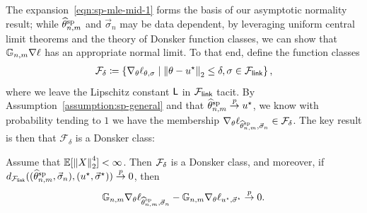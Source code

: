 The expansion~\eqref{eqn:sp-mle-mid-1} forms the basis of our asymptotic
normality result; while $\widehat{\theta}^{\textup{sp}}_{n,m}$ and $\vec{\sigma}_n$ may be data
dependent, by leveraging uniform central limit theorems and the
theory of Donsker function classes, we can show that
$\mathbb{G}_{n,m} \nabla \ell$ has an appropriate normal limit.
To that end,
define the
function classes
\begin{align*}
	\mathcal{F}_{\delta}
	\coloneqq \left\{\nabla_\theta \ell_{\theta, \sigma}
	\mid \left\|{\theta - u^\star}\right\|_2 \leq \delta,
	\sigma \in \mathcal{F}_{\mathsf{link}} \right\},
\end{align*}
where we leave the Lipschitz constant $\mathsf{L}$ in $\mathcal{F}_{\mathsf{link}}$ tacit.
By Assumption~\ref{assumption:sp-general} and that $\widehat{\theta}^{\textup{sp}}_{n,m} \stackrel{p}{\rightarrow} u^\star$, we know
with probability tending to $1$ we have the membership $
\nabla_\theta\ell_{\widehat{\theta}^{\textup{sp}}_{n,m}, \vec{\sigma}_n} \in \mathcal{F}_\delta$. The key
result is then that $\mathcal{F}_\delta$ is a Donsker class:
\begin{lemma}
  \label{lemma:donsker-sp}
  Assume that $\mathbb{E} [\left\|{X}\right\|_2^4] < \infty$.  Then $\mathcal{F}_\delta$ is a
  Donsker class, and moreover, if $d_{\mathcal{F}_{\mathsf{link}}}((\widehat{\theta}^{\textup{sp}}_{n,m}, \vec{\sigma}_n),
  (u^\star, \vec{\sigma}^\star)) \stackrel{p}{\rightarrow} 0$, then
  \begin{equation*}
    \mathbb{G}_{n,m} \nabla_\theta\ell_{\widehat{\theta}^{\textup{sp}}_{n,m}, \vec{\sigma}_n}
    - \mathbb{G}_{n,m} \nabla_\theta\ell_{u^\star, \vec{\sigma}^\star} \stackrel{p}{\rightarrow} 0.
  \end{equation*}
\end{lemma}

